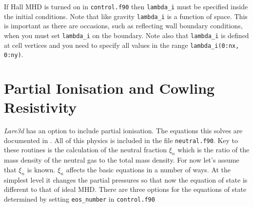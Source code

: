 \documentclass[11pt]{article}
\begin{document}
If Hall MHD is turned on in \texttt{control.f90} then {\tt lambda\_i} must be specified inside the initial conditions. Note that like gravity {\tt lambda\_i} is a function of space. This is important as there are occasions, such as reflecting wall boundary conditions, when you must set {\tt lambda\_i} on the boundary. Note also that {\tt lambda\_i} is defined at cell vertices and you need to specify all values in the range {\tt lambda\_i(0:nx, 0:ny)}.

\section{Partial Ionisation and Cowling Resistivity}
{\it Lare3d} has an option to include partial ionisation. The equations this solves are documented in \cite{flux-emergence}. All of this physics is included in the file \texttt{neutral.f90}. Key to these routines is the calculation of the neutral fraction $\xi_n$ which is the ratio of the mass density of the neutral gas to the total mass density. For now let's assume that $\xi_n$ is known. $\xi_n$ affects the basic equations in a number of ways. At the simplest level it changes the partial pressures so that now the equation of state is different to that of ideal MHD. There are three options for the equations of state determined by setting \texttt{eos\_number} in \texttt{control.f90}
\end{document}
